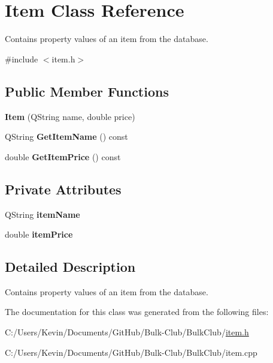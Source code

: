 \hypertarget{class_item}{}\section{Item Class Reference}
\label{class_item}


Contains property values of an item from the database.  




{\ttfamily \#include $<$item.\+h$>$}

\subsection*{Public Member Functions}
\begin{DoxyCompactItemize}
\item 
\mbox{\label{class_item_a53775715216c52abe8b935716fe2f9c0}} 
{\bfseries Item} (Q\+String name, double price)
\item 
\mbox{\label{class_item_a2d931852889fde95b3555b0fedbffc09}} 
Q\+String {\bfseries Get\+Item\+Name} () const
\item 
\mbox{\label{class_item_a402405e399d9fa866090a90931817c1d}} 
double {\bfseries Get\+Item\+Price} () const
\end{DoxyCompactItemize}
\subsection*{Private Attributes}
\begin{DoxyCompactItemize}
\item 
\mbox{\label{class_item_ae145622d2df65a4a45979fd7933b30c7}} 
Q\+String {\bfseries item\+Name}
\item 
\mbox{\label{class_item_aa3f106177de7d68189cfe2b9051a54fd}} 
double {\bfseries item\+Price}
\end{DoxyCompactItemize}


\subsection{Detailed Description}
Contains property values of an item from the database. 

The documentation for this class was generated from the following files\+:\begin{DoxyCompactItemize}
\item 
C\+:/\+Users/\+Kevin/\+Documents/\+Git\+Hub/\+Bulk-\/\+Club/\+Bulk\+Club/\mbox{\hyperlink{item_8h}{item.\+h}}\item 
C\+:/\+Users/\+Kevin/\+Documents/\+Git\+Hub/\+Bulk-\/\+Club/\+Bulk\+Club/item.\+cpp\end{DoxyCompactItemize}

